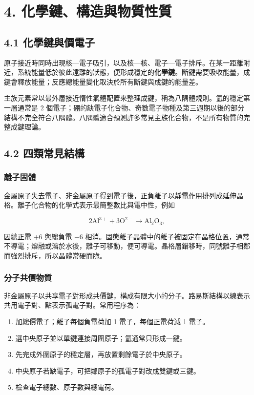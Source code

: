 \documentclass[11pt,a4paper]{article}
\providecommand{\tightlist}{%
  \setlength{\itemsep}{0pt}\setlength{\parskip}{0pt}}
\begin{document}
\section{4. 化學鍵、構造與物質性質}\label{ux5316ux5b78ux9375ux69cbux9020ux8207ux7269ux8ceaux6027ux8cea}

\subsection{4.1 化學鍵與價電子}\label{ux5316ux5b78ux9375ux8207ux50f9ux96fbux5b50}

原子接近時同時出現核---電子吸引，以及核---核、電子---電子排斥。在某一距離附近，系統能量低於彼此遠離的狀態，便形成穩定的\textbf{化學鍵}。斷鍵需要吸收能量，成鍵會釋放能量；反應總能量變化取決於所有斷鍵與成鍵的能量差。

主族元素常以最外層接近惰性氣體配置來整理成鍵，稱為八隅體規則。氫的穩定第一層通常是 2 個電子；硼的缺電子化合物、奇數電子物種及第三週期以後的部分結構不完全符合八隅體。八隅體適合預測許多常見主族化合物，不是所有物質的完整成鍵理論。

\subsection{4.2 四類常見結構}\label{ux56dbux985eux5e38ux898bux7d50ux69cb}

\subsubsection{離子固體}\label{ux96e2ux5b50ux56faux9ad4}

金屬原子失去電子、非金屬原子得到電子後，正負離子以靜電作用排列成延伸晶格。離子化合物的化學式表示最簡整數比與電中性，例如

\[
2\mathrm{Al}^{3+}+3\mathrm O^{2-}\longrightarrow \mathrm{Al_2O_3},
\]

因總正電 \(+6\) 與總負電 \(-6\) 相消。固態離子晶體中的離子被固定在晶格位置，通常不導電；熔融或溶於水後，離子可移動，便可導電。晶格層錯移時，同號離子相鄰而強烈排斥，所以晶體常硬而脆。

\subsubsection{分子共價物質}\label{ux5206ux5b50ux5171ux50f9ux7269ux8cea}

非金屬原子以共享電子對形成共價鍵，構成有限大小的分子。路易斯結構以線表示共用電子對、點表示孤電子對。常用程序為：

\begin{enumerate}
\def\labelenumi{\arabic{enumi}.}
\tightlist
\item
  加總價電子；離子每個負電荷加 1 電子，每個正電荷減 1 電子。
\item
  選中央原子並以單鍵連接周圍原子；氫通常只形成一鍵。
\item
  先完成外圍原子的穩定層，再放置剩餘電子於中央原子。
\item
  中央原子若缺電子，可把鄰原子的孤電子對改成雙鍵或三鍵。
\item
  檢查電子總數、原子數與總電荷。
\end{enumerate}
\end{document}
